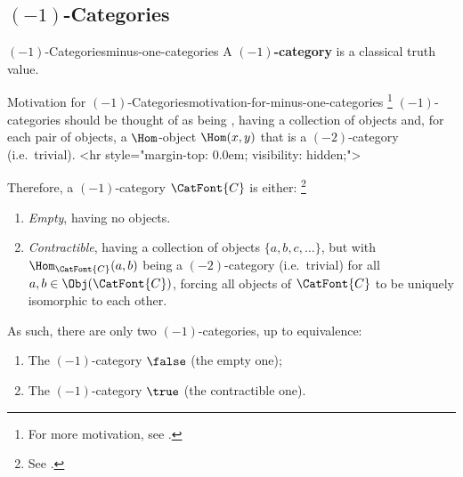 \subsection{\texorpdfstring{$(-1)$}{(-1)}-Categories}\label{subsection-minus-one-categories}
\begin{definition}{$(-1)$-Categories}{minus-one-categories}%
    A \textbf{$(-1)$-category} is a classical truth value.%
\end{definition}
\begin{remark}{Motivation for $(-1)$-Categories}{motivation-for-minus-one-categories}%
    \footnote{%
        For more motivation, see \cite[p.~13]{lectures-on-n-categories-and-cohomology}.
        \par\vspace*{\TCBBoxCorrection}
    }%
    $(-1)$-categories should be thought of as being , having a collection of objects and, for each pair of objects, a $\Hom$-object $\Hom(x,y)$ that is a $(-2)$-category (i.e.\ trivial).
    <hr style="margin-top: 0.0em; visibility: hidden;">

    \vspace{0.5\baselineskip}
    Therefore, a $(-1)$-category $\CatFont{C}$ is either:%
    \footnote{%
        See \cite[pp.~33--34]{lectures-on-n-categories-and-cohomology}.
    }%
    \begin{enumerate}
        \item\label{motivation-for-minus-one-categories-empty}\emph{Empty}, having no objects.
        \item\label{motivation-for-minus-one-categories-contractible}\emph{Contractible}, having a collection of objects $\{a,b,c,\ldots\}$, but with $\Hom_{\CatFont{C}}(a,b)$ being a $(-2)$-category (i.e.\ trivial) for all $a,b\in\Obj(\CatFont{C})$, forcing all objects of $\CatFont{C}$ to be uniquely isomorphic to each other.
    \end{enumerate}
    As such, there are only two $(-1)$-categories, up to equivalence:
    \begin{enumerate}
        \item\label{motivation-for-minus-one-categories-false}The $(-1)$-category $\false$ (the empty one);
        \item\label{motivation-for-minus-one-categories-true}The $(-1)$-category $\true$  (the contractible one).%
    \end{enumerate}
\end{remark}
